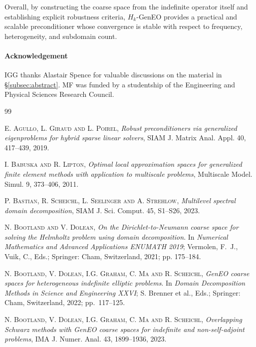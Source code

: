 \documentclass[numbers,webpdf,imaiai]{ima-authoring-template}%
\theoremstyle{thmstyletwo}%
\numberwithin{equation}{section}
\numberwithin{equation}{section}
\begin{document}
{Overall, by constructing the coarse space from the indefinite operator itself and establishing explicit robustness criteria, 
$H_k$-GenEO provides a practical and scalable preconditioner whose convergence is stable with respect to frequency, 
heterogeneity, and subdomain count.

\paragraph{Acknowledgement} 
IGG thanks Alastair Spence for valuable discussions on the material in \S \ref{subsec:abstract}.
MF was funded by a studentship of the Engineering and Physical Sciences Research Council.


\begin{thebibliography}{99}


\textsc{E. Agullo, L. Giraud and L. Poirel},
\textit{Robust preconditioners via generalized eigenproblems for hybrid sparse linear solvers},
SIAM J. Matrix Anal. Appl. 40, 417--439, 2019.

\textsc{I. Babuska and R. Lipton}, 
\textit{Optimal local approximation spaces for generalized finite element
methods with application to multiscale problems},
Multiscale Model. Simul. 9, 373--406, 2011.

\textsc{P. Bastian, R. Scheichl, L. Seelinger and A. Strehlow},
\textit{Multilevel spectral domain decomposition}, 
SIAM J. Sci. Comput. 45, S1--S26, 2023.

\textsc{N. Bootland and V. Dolean}, 
\textit{On the {Dirichlet-to-Neumann} coarse space for solving the {Helmholtz} problem using domain decomposition}. 
In \textit{Numerical Mathematics and Advanced Applications ENUMATH 2019}; Vermolen, F.~J., Vuik, C., Eds.; 
Springer: Cham, Switzerland, 2021; pp. 175--184.

\textsc{N. Bootland, V. Dolean, I.G. Graham, C. Ma and R. Scheichl}, 
\textit{{GenEO} coarse spaces for heterogeneous indefinite elliptic problems}. 
In \textit{Domain Decomposition Methods in Science and Engineering XXVI}; 
S. Brenner et al., Eds.; Springer: Cham, Switzerland, 2022; pp.~117--125.

\textsc{N. Bootland, V. Dolean, I.G. Graham, C. Ma and R. Scheichl}, 
\textit{Overlapping {Schwarz} methods with GenEO coarse spaces for indefinite and non-self-adjoint problems},
IMA J. Numer. Anal. 43, 1899--1936, 2023.


\end{thebibliography}}
\end{document}
